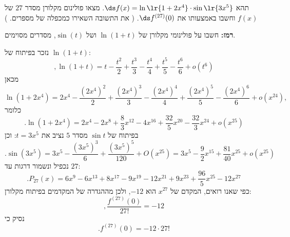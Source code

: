 תהא $\ds f(x)=\ln\lr{1+2x^4}\cdot\sin\lr{3x^5}$. מצאו פולינום מקלורן מסדר $27$ של $f(x)$ וחשבו באמצעותו את $\ds f^{(27)}(0)$. (
את התשובה השאירו כמכפלה של מספרים.
)

\textbf{רמז:}
 חשבו על פולינומי מקלורן של
 $\ln(1+t)$
 ושל
 $\sin(t)$,
 מסדרים מסוימים.
\begin{solbox}
נזכר בפיתוח
של
$\ln(1+t)$:
$$,\ln(1+t)=t-\frac{t^2}{2}+\frac{t^3}{3}-\frac{t^4}{4}+\frac{t^5}{5}-\frac{t^6}{6}+o(t^6)$$
מכאן
\[
\ln(1+2x^4)=2x^4-\frac{(2x^4)^2}{2}+\frac{(2x^4)^3}{3}-\frac{(2x^4)^4}{4}
+\frac{(2x^4)^5}{5}-\frac{(2x^4)^6}{6}+o(x^{24}),
\]
כלומר
\[
.\ln(1+2x^4)=2x^4-2x^8+\frac{8}{3}x^{12}-4x^{16}+\frac{32}{5}x^{20}-\frac{32}{3}x^{24}+o(x^{25})
\]
בפיתוח של
$\sin t$
מסדר
$5$
נציב את
$t=3x^5$:
וכן
\[
.\sin(3x^5)=3x^5-\frac{(3x^5)^3}{6}+\frac{(3x^5)^5}{120}+O(x^{25})
=3x^5-\frac{9}{2}x^{15}+\frac{81}{40}x^{25}+o(x^{25})
\]
נכפיל ונשמור דרגות עד \(27\):
\[
.P_{27}(x)=6x^9-6x^{13}+8x^{17}-9x^{19}-12x^{21}+9x^{23}+\frac{96}{5}x^{25}-12x^{27}
\]
כפי שאנו רואים, המקדם של \(x^{27}\) הוא \(-12\), ולכן
מההגדרה של המקדמים בפיתוח מקלורן:
\[
,\frac{f^{(27)}(0)}{27!}=-12
\]
נסיק כי
$$.f^{(27)}(0)=-12\cdot 27!$$
\end{solbox}
